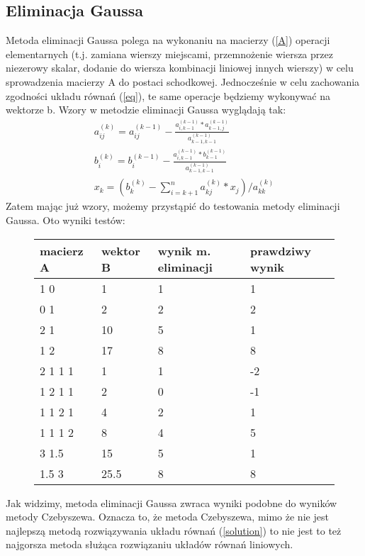 \documentclass[a4paper]{article}
\begin{document}
\subsection{Eliminacja Gaussa}
Metoda eliminacji Gaussa polega na wykonaniu na macierzy (\ref{A}) operacji elementarnych (t.j. zamiana wierszy miejscami, przemnożenie wiersza przez niezerowy skalar, dodanie do wiersza kombinacji liniowej innych wierszy) w celu sprowadzenia macierzy A do postaci schodkowej. Jednocześnie w celu zachowania zgodności układu równań (\ref{eq}), te same operacje będziemy wykonywać na wektorze b. Wzory w metodzie eliminacji Gaussa wyglądają tak:
\begin{equation}
\begin{array}{c}
a_{ij}^{(k)}=a_{ij}^{(k-1)}-\frac{a_{i, k-1}^{(k-1)}*a_{k-1, j}^{(k-1)}}{a_{k-1, k-1}^{(k-1)}} \\
b_i^{(k)}=b_i^{(k-1)}-\frac{a_{i, k-1}^{(k-1)}*b_{k-1}^{(k-1)}}{a_{k-1, k-1}^{(k-1)}} \\
x_k=(b^{(k)}_k-\sum^n_{i=k+1}a_{kj}^{(k)}*x_j)/a_{kk}^{(k)}
\end{array}
\end{equation}
Zatem mając już wzory, możemy przystąpić do testowania metody eliminacji Gaussa. Oto wyniki testów:
\begin{figure}[H]
\begin{tabular}{|l|l|l|l|}
\hline
macierz A & wektor B & wynik m. eliminacji & prawdziwy wynik \\
\hline
1 0 & 1 & 1 & 1 \\
0 1 & 2 & 2 & 2 \\
\hline
2 1 & 10 & 5 & 1 \\
1 2 & 17 & 8 & 8 \\
\hline
2 1 1 1 & 1 & 1 & -2 \\
1 2 1 1 & 2 & 0 & -1 \\
1 1 2 1 & 4 & 2 & 1 \\
1 1 1 2 & 8 & 4 & 5 \\
\hline
3 1.5 & 15 & 5 & 1 \\
1.5 3 & 25.5 & 8 & 8 \\
\hline
\end{tabular}
\end{figure}
Jak widzimy, metoda eliminacji Gaussa zwraca wyniki podobne do wyników metody Czebyszewa. Oznacza to, że metoda Czebyszewa, mimo że nie jest najlepszą metodą rozwiązywania układu równań (\ref{solution}) to nie jest to też najgorsza metoda służąca rozwiązaniu układów równań liniowych.
\end{document}
